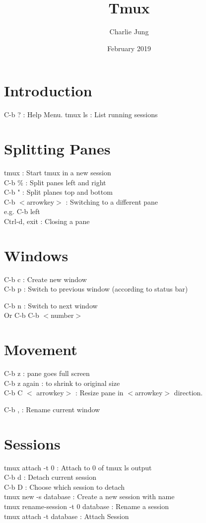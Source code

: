 \documentclass{article}
\title{Tmux}
\author{Charlie Jung}
\date{February 2019}
\begin{document}
\maketitle

\section{Introduction}
 C-b ? : Help Menu.
 tmux ls : List running sessions
\\
\section{Splitting Panes}

 tmux : Start tmux in a new session
\\
 C-b \% : Split panes left and right
\\
 C-b " : Split planes top and bottom
\\
 C-b $<$arrowkey$>$ : Switching to a different pane
\\
e.g.  C-b left 
\\

 Ctrl-d, exit : Closing a pane

\section{Windows}


 C-b c : Create new window
\\
 C-b p : Switch to previous window (according to status bar)


 C-b n : Switch to next window
\\
Or C-b  C-b $<$number$>$
\\
\section{Movement}

 C-b z : pane goes full screen
\\
 C-b z again : to shrink to original size
\\
 C-b C $<$ arrowkey$>$ : Resize pane in $<$arrowkey$>$  direction.

 C-b , : Rename current window







\section{Sessions}

 tmux attach -t 0 : Attach to 0 of tmux ls output
\\
 C-b d : Detach current session
\\
 C-b D : Choose which session to detach
\\
 tmux new -s database : Create a new session with name
\\
 tmux rename-session -t 0 database : Rename a session
\\
 tmux attach -t database : Attach Session
\end{document}
